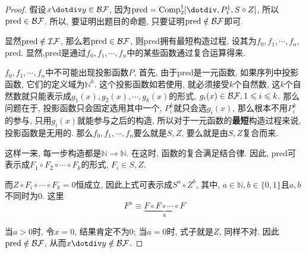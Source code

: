 \begin{proof}
假设$x\dotdiv y\in\BF$, 因为$\mathrm{pred}=\mathrm{Comp}_2^1[\dotdiv,P_1^1,S\circ Z]$, 所以$\mathrm{pred}\in\mathcal{BF}$. 所以, 要证明出题目的命题, 只要证明$\mathrm{pred}\notin\mathcal{BF}$即可.

显然$\mathrm{pred}\notin\mathcal{IF}$, 那么若$\mathrm{pred}\in\mathcal{BF}$, 则$\mathrm{pred}$拥有最短构造过程, 设其为$f_0,f_1,\cdots,f_n,$ $\mathrm{pred}$. 显然,$\mathrm{pred}$是通过$f_0,f_1,\cdots,f_n$中的某些函数通过复合运算得来.

$f_0,f_1,\cdots,f_n$中不可能出现投影函数$P$, 首先, 由于$\mathrm{pred}$是一元函数, 如果序列中投影函数, 它们的定义域为$\mathbb{N}^k$. 这个投影函数如若使用, 就必须接受$k$个自然数, 这$k$个自然数就只能表示成$g_1(x),g_2(x),\cdots,g_k(x)$的形式, $g_i(x)\in\mathcal{BF},1\leqslant i\leqslant k$. 那么问题在于, 投影函数只会固定选用其中一个, $P_i^k$就只会选$g_i(x)$, 那么根本不用$P_i^k$的参与, 只用$g_i(x)$就能参与之后的构造, 所以对于一元函数的\textbf{最短}构造过程来说, 投影函数是无用的. 那么$f_0,f_1,\cdots,f_n$要么就是$S, Z$, 要么就是由$S, Z$复合而来.

这样一来, 每一步构造都是$\mathbb{N}\to\mathbb{N}$. 在这时, 函数的复合满足结合律. 因此, $\mathrm{pred}$可表示成$F_1\circ F_2\circ \cdots \circ F_k$的形式, $F_i\in{S,Z}$.

而$Z\circ F_i\circ \cdots \circ F_k=0$恒成立, 因此上式可表示成$S^a\circ Z^b$, 其中, $a\in\mathbb{N},b\in\{0,1\}$且$a,b$不同时为0. 这里$$F^a\equiv \underbrace{F\circ F\circ \cdots \circ F}_{a}$$

当$a>0$时, 令$x=0$, 结果肯定不为0; 当$a=0$时, 式子就是$Z$, 同样不对. 因此$\mathrm{pred}\notin\mathcal{BF}$, 从而$x\dotdiv y\notin\BF$.
\end{proof}